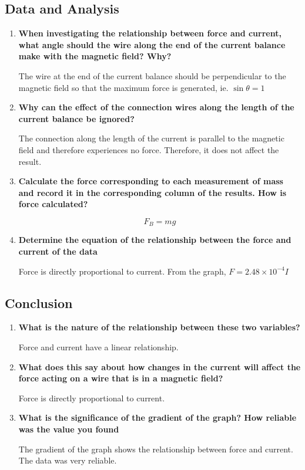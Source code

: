 	\subsection{Data and Analysis}
		\begin{enumerate}
			\item \textbf{When investigating the relationship between force and current, what angle should the wire along the end of the current balance make with the magnetic field? Why?}

				The wire at the end of the current balance should be perpendicular to the magnetic field so that the maximum force is generated, ie. $\sin{\theta}=1$

			\item \textbf{Why can the effect of the connection wires along the length of the current balance be ignored?}
				
				The connection along the length of the current is parallel to the magnetic field and therefore experiences no force. Therefore, it does not affect the result.

			\item \textbf{Calculate the force corresponding to each measurement of mass and record it in the corresponding column of the results. How is force calculated?}
				
				$$F_B = mg$$

			\item \textbf{Determine the equation of the relationship between the force and current of the data}

				Force is directly proportional to current. From the graph, $F = 2.48 \times 10^{-4} I$
		
		\end{enumerate}
	
	\subsection{Conclusion}
		\begin{enumerate}
			\item \textbf{What is the nature of the relationship between these two variables?}

				Force and current have a linear relationship.

			\item \textbf{What does this say about how changes in the current will affect the force acting on a wire that is in a magnetic field?}

				Force is directly proportional to current.

			\item \textbf{What is the significance of the gradient of the graph? How reliable was the value you found}

				The gradient of the graph shows the relationship between force and current. The data was very reliable.

		\end{enumerate}

